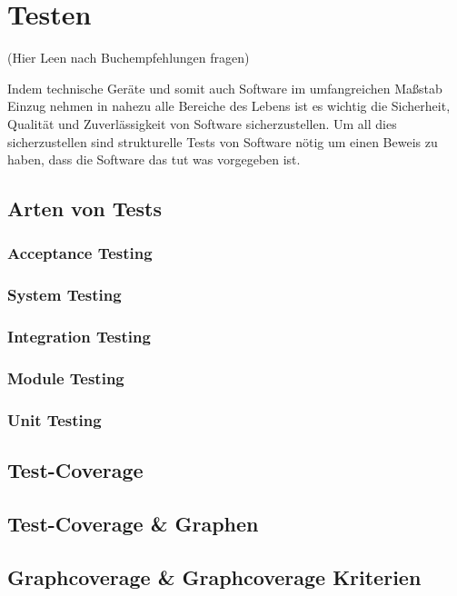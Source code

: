 \section{Testen}

(Hier Leen nach Buchempfehlungen fragen)

Indem technische Geräte und somit auch Software im umfangreichen Maßstab Einzug nehmen in nahezu alle Bereiche des
Lebens ist es wichtig die Sicherheit, Qualität und Zuverlässigkeit von Software sicherzustellen.
Um all dies sicherzustellen sind strukturelle Tests von Software nötig um einen Beweis zu haben, dass die Software
das tut was vorgegeben ist.

\subsection{Arten von Tests}

\subsubsection{Acceptance Testing}

\subsubsection{System Testing}

\subsubsection{Integration Testing}

\subsubsection{Module Testing}

\subsubsection{Unit Testing}

\subsection{Test-Coverage}

\subsection{Test-Coverage & Graphen}

\subsection{Graphcoverage & Graphcoverage Kriterien}

